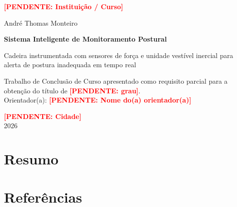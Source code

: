 \documentclass[12pt,a4paper]{article}
\newcommand{\pendente}[1]{\textcolor{red}{\textbf{[PENDENTE: #1]}}}
\newcommand{\instituicao}{\pendente{Instituição / Curso}}
\newcommand{\orientador}{\pendente{Nome do(a) orientador(a)}}
\newcommand{\cidade}{\pendente{Cidade}}
\begin{document}
\begin{titlepage}
  \centering
  {\large\instituicao\par}
  \vspace{4cm}
  {\large André Thomas Monteiro\par}
  \vspace{3cm}
  {\LARGE\textbf{Sistema Inteligente de Monitoramento Postural}\par}
  \vspace{0.5cm}
  {\large Cadeira instrumentada com sensores de força e unidade vestível
  inercial para alerta de postura inadequada em tempo real\par}
  \vspace{2cm}
  \hfill\begin{minipage}{0.55\linewidth}
    \singlespacing
    Trabalho de Conclusão de Curso apresentado como requisito parcial para a
    obtenção do título de \pendente{grau}.\\[0.5em]
    Orientador(a): \orientador
  \end{minipage}
  \vfill
  {\cidade\\ 2026\par}
\end{titlepage}

\section*{Resumo}


\clearpage
\tableofcontents
\clearpage
\listoffigures
\listoftables
\clearpage








\clearpage
\section*{Referências}

\end{document}
